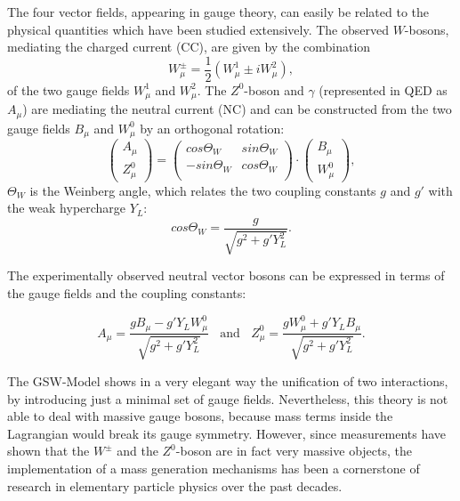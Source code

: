 The four vector fields, appearing in gauge theory, can easily be related to the physical quantities which have been studied extensively. 
The observed $W$-bosons, mediating the charged current (CC), are given by the combination
\begin{equation}\label{EWtrafo1}
 W^{\pm}_\mu = \frac{1}{2}(W^{1}_\mu\pm iW^{2}_\mu),
\end{equation}
of the two gauge fields $W^{1}_\mu$ and $W^{2}_\mu$. The $Z^0$-boson and $\gamma$ (represented in QED as $A_\mu$) are mediating the neutral current (NC) and can be constructed from the two gauge fields $B_{\mu}$ and $W_{\mu}^{0}$ by an orthogonal rotation:
\begin{equation}\label{EWtrafo2}
\begin{pmatrix}
A_\mu\\
Z^0_\mu
\end{pmatrix}
=
\begin{pmatrix}
cos\Theta_W & sin\Theta_ W \\
-sin\Theta_W & cos\Theta_W  \\

\end{pmatrix}
\cdot 
\begin{pmatrix}
B_\mu\\
W^0_\mu
\end{pmatrix},
\end{equation}
 $\Theta_W$ is the Weinberg angle, which relates the two coupling constants $g$ and $g'$ with the weak hypercharge $Y_L$:
\begin{equation}\label{Weinber2}
cos \Theta_W = \frac{g}{\sqrt{g^2+g'Y^2_L}}.
\end{equation} 

The experimentally observed neutral vector bosons can be expressed in terms of the gauge fields and the coupling constants: 

\begin{equation}
A_\mu = \frac{gB_\mu -g'Y_LW_\mu^0}{\sqrt{g^2+g'Y^2_L}} ~~~~\mathrm{and} ~~~~Z_\mu^0 = \frac{gW_\mu^0 +g'Y_LB_\mu}{\sqrt{g^2+g'Y^2_L}}.
\end{equation}

The GSW-Model shows in a very elegant way the unification of two interactions, by introducing just a minimal set of gauge fields. Nevertheless, this theory is not able to deal with massive gauge bosons, because mass terms inside the Lagrangian would break its gauge symmetry. However, since measurements have shown that the $W^\pm$ and the $Z^0$-boson are in fact very massive objects, the implementation of a mass generation mechanisms has been a cornerstone of research in elementary particle physics over the past decades.

